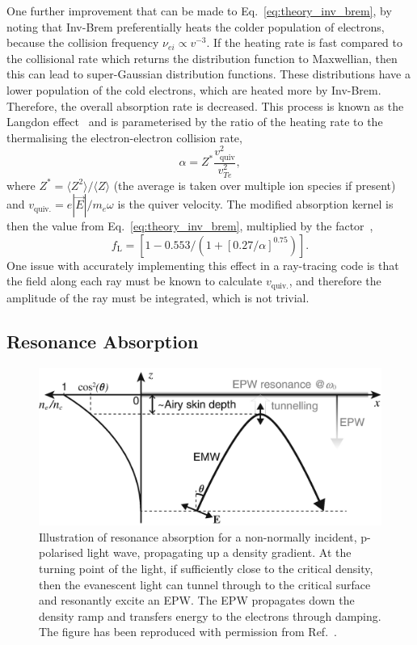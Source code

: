 One further improvement that can be made to Eq.~\ref{eq:theory_inv_brem}, by noting that \ac{Inv-Brem} preferentially heats the colder population of electrons, because the collision frequency $\nu_{ei}\propto v^{-3}$.
If the heating rate is fast compared to the collisional rate which returns the distribution function to Maxwellian, then this can lead to super-Gaussian distribution functions.
These distributions have a lower population of the cold electrons, which are heated more by \ac{Inv-Brem}.
Therefore, the overall absorption rate is decreased.
This process is known as the Langdon effect~\cite{langdon_nonlinear_1980} and is parameterised by the ratio of the heating rate to the thermalising the electron-electron collision rate,
\begin{equation}
    \alpha = Z^* \frac{v_{\text{quiv}}^2}{v_{Te}^2},
\end{equation}
where $Z^* = \langle Z^2 \rangle / \langle Z \rangle $ (the average is taken over multiple ion species if present) and $v_{\text{quiv.}} = e|\vec{E}|/m_e \omega$ is the quiver velocity.
The modified absorption kernel is then the value from Eq.~\ref{eq:theory_inv_brem}, multiplied by the factor~\cite{colaitis_inverse_2021},
\begin{equation}
    f_{\text{L}} = \left[ 1 - 0.553/\left( 1 + {[0.27/\alpha]}^{0.75} \right) \right].
\end{equation}
One issue with accurately implementing this effect in a ray-tracing code is that the field along each ray must be known to calculate $v_{\text{quiv.}}$, and therefore the amplitude of the ray must be integrated, which is not trivial.

\subsection{Resonance Absorption}%
\label{sec:theory_res_abs}

\begin{figure}[t!]
    \includegraphics[width=0.65\linewidth]{Theory/Images/Res_Abs.png}
    \centering
    \caption{Illustration of resonance absorption for a non-normally incident, p-polarised light wave, propagating up a density gradient.
    At the turning point of the light, if sufficiently close to the critical density, then the evanescent light can tunnel through to the critical surface and resonantly excite an \ac{EPW}.
    The \ac{EPW} propagates down the density ramp and transfers energy to the electrons through damping.
    The figure has been reproduced with permission from Ref.~\cite{michel_introduction_2023}.}%
    \label{fig:theory_res_abs}
\end{figure}

